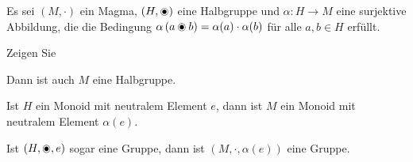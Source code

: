 \begin{Problem}
	Es sei $(M, \cdot)$ ein Magma, $(H, \circledcirct)$ eine Halbgruppe und $\alpha : H \to M$ eine surjektive Abbildung, die die Bedingung $\alpha\left( a\circledcirct b \right) =\alpha(a)\cdot\alpha(b)$ für alle $a, b \in H$ erfüllt.

	Zeigen Sie
	\begin{parts}
	\item Dann ist auch $M$ eine Halbgruppe.
	\item Ist $H$ ein Monoid mit neutralem Element $e$, dann ist $M$ ein Monoid mit neutralem Element $\alpha(e)$. 
	\item Ist $(H, \circledcirct, e)$ sogar eine Gruppe, dann ist $(M, \cdot, \alpha(e))$ eine Gruppe.
	\end{parts}
\end{Problem}

